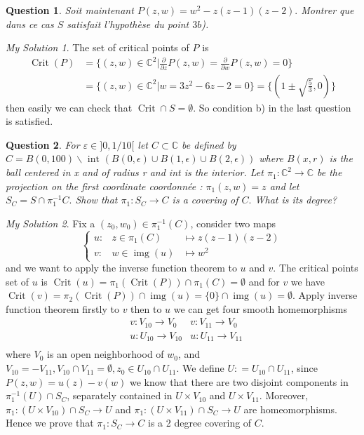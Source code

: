 \documentclass[]{article}
\newtheorem{prop}{Question}
\theoremstyle{remark}
\newtheorem*{sol}{My Solution}
\begin{document}
\begin{prop}
	Soit maintenant $P(z, w)=w^{2}-z(z-1)(z-2) .$ Montrer que dans ce cas $S$ satisfait l'hypothèse du point $3 b$).
\end{prop}
\begin{sol}
	The set of critical points of $ P $ is
\[ \begin{aligned}
		\operatorname{Crit}(P)&=\{(z,w)\in \mathbb{C}^2 |\frac{\partial}{\partial z} P(z, w)=\frac{\partial}{\partial w} P(z, w)=0\}\\
		&=\{(z,w)\in \mathbb{C}^2 | w=3z^2-6z-2=0\}=\{(1\pm \sqrt{\frac{5}{3}},0)\}
\end{aligned} \]
	then easily we can check that $ \operatorname{Crit} \cap S = \emptyset. $ So condition b) in the last question is satisfied.
\end{sol}
\begin{prop}
	For $\varepsilon \in] 0,1 / 10[ $ let $ C \subset \mathbb{C} $ be defined by $ C=B(0,100) \backslash \text { int }(B(0, \epsilon) \cup B(1, \epsilon) \cup B(2, \epsilon))$ where $ B(x,r) $ is the ball centered in x and of radius r and int is the interior. Let $\pi_{1}: \mathbb{C}^{2} \rightarrow \mathbb{C}$ be the projection on the first coordinate coordonnée : $\pi_{1}(z, w)=z$ and let $S_{C}=S \cap \pi_{1}^{-1} C .$ Show that $\pi_{1}: S_{C} \rightarrow C$ is a covering of $C .$ What is its degree?
\end{prop}
\begin{sol}
	Fix a $ (z_0, w_0)  \in \pi_{1}^{-1}(C) $, consider two maps
	\[ \left\lbrace \begin{array}{rll}
	u: &z\in \pi_1{(C)} &\mapsto z(z-1)(z-2) \\
	v: &w\in \operatorname{img}(u) &\mapsto w^2
	\end{array}
	\right.  \]
	and we want to apply the inverse function theorem to $ u $ and $ v .$
	The critical points set of $ u $ is $ \operatorname{Crit}(u)= \pi_1(\operatorname{Crit}(P)) \cap \pi_1(C) = \emptyset$ and for $ v $ we have $ \operatorname{Crit}(v)=  \pi_2(\operatorname{Crit}(P)) \cap \operatorname{img}(u) = \{0\}\cap \operatorname{img}(u) = \emptyset.$ Apply inverse function theorem firstly to $ v $ then to $ u $ we can get four smooth homemorphisms
	\[ \begin{matrix}
		&v:V_{10} \rightarrow V_{0} & v:V_{11} \rightarrow V_{0} 	\\
		&u:U_{10} \rightarrow V_{10} & u:U_{11} \rightarrow V_{11} \\ 
	\end{matrix} \]
	where $ V_0 $ is an open neighborhood of $ w_0 $, and $ V_{10}=- V_{11}, V_{10}\cap V_{11} = \emptyset, z_0 \in U_{10} \cap U_{11} $. We define $ U : = U_{10} \cap U_{11} $, since $ P(z,w)=u(z)-v(w) $ we know that there are two disjoint components in $ \pi_{1}^{-1}(U) \cap S_C$, separately contained in $ U\times V_{10}  $ and $ U\times V_{11} $. Moreover, $ \pi_{1}:( U\times V_{10})\cap S_C \rightarrow U $ and $ \pi_{1}: (U\times V_{11})\cap S_C \rightarrow U $ are homeomorphisms. Hence we prove that $\pi_{1}: S_{C} \rightarrow C$ is a 2 degree covering of $C$.
\end{sol}
\end{document}
